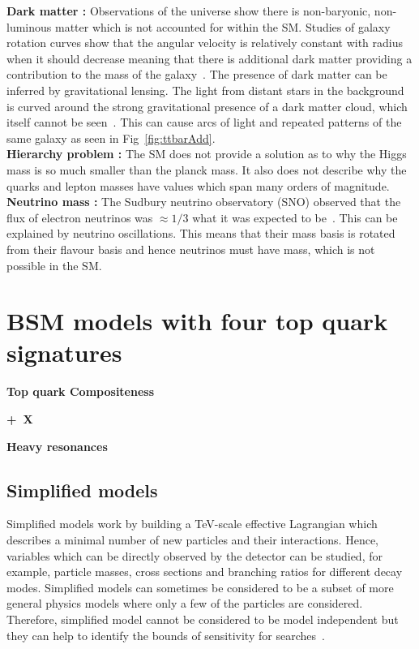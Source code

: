 {\bf Dark matter :} Observations of the universe show there is non-baryonic, non-luminous matter which is not accounted for within the SM. Studies of galaxy rotation curves show that the angular velocity is relatively constant with radius when it should decrease meaning that there is additional dark matter providing a contribution to the mass of the galaxy~\cite{Volders,
Jog:2002dg,
Persic:1995ru}. The presence of dark matter can be inferred by gravitational lensing. The light from distant stars in the background is curved around the strong gravitational presence of a dark matter cloud, which itself cannot be seen~\cite{Einstein,Ellis2010}. 
This can cause arcs of light and repeated patterns of the same galaxy as seen in Fig~\ref{fig:ttbarAdd}.\\
{\bf Hierarchy problem :} The SM does not provide a solution as to why the Higgs mass is so much smaller than the planck mass. It also does not describe why the quarks and lepton masses have values which span many orders of magnitude.\\
{\bf Neutrino mass :}
The Sudbury neutrino observatory (SNO) observed that the flux of electron neutrinos was $\approx 1/3$ what it was expected to be~\cite{PhysRevC.88.025501}. This can be explained by neutrino oscillations. This means that their mass basis is rotated from their flavour basis and hence neutrinos must have mass, which is not possible in the SM.



\section{BSM models with four top quark signatures}

\textbf{Top quark Compositeness}

\textbf{\ttbar+~X}

\textbf{Heavy resonances}



\subsection{Simplified models}

Simplified models work by building a TeV-scale effective Lagrangian which describes a minimal number of new particles and their interactions. Hence, variables which can be directly observed by the detector can be studied, for example, particle masses, cross sections and branching ratios for different decay modes. Simplified models can sometimes be considered to be a subset of more general physics models where only a few of the particles are considered. Therefore, simplified model cannot be considered to be model independent but they can help to identify the bounds of sensitivity for searches~\cite{0954-3899-39-10-105005}.


